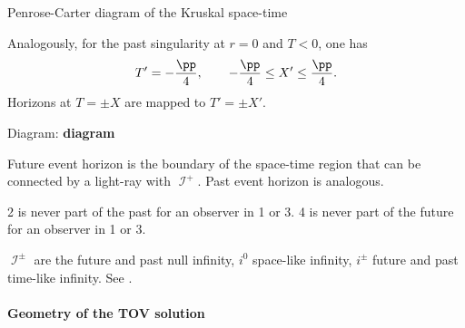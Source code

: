 \begin{nameddef}{Penrose-Carter diagram of the Kruskal space-time}

Analogously, for the past singularity at $r = 0$ and $T < 0$, one has
\begin{equation}
T' = -\frac{\pp}{4},\qquad -\frac{\pp}{4} \le X' \le \frac{\pp}{4}.
\end{equation}
Horizons at $T = \pm X$ are mapped to $T' = \pm X'$.

Diagram: \textbf{diagram}

Future event horizon is the boundary of the space-time region that can be
connected by a light-ray with $\mscrI^+$. Past event horizon is analogous.

2 is never part of the past for an observer in 1 or 3. 4 is never part of the
future for an observer in 1 or 3.

$\mscrI^\pm$ are the future and past null infinity, $i^0$ space-like infinity,
$i^\pm$ future and past time-like infinity. See \cite{Hawking2010}.
\end{nameddef} %

\paragraph{Geometry of the TOV solution}

